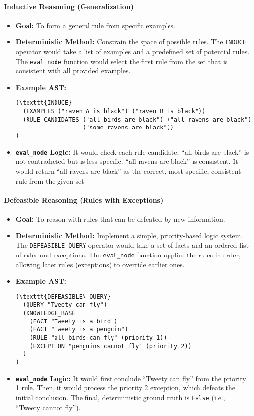 \documentclass{article}
\begin{document}
\paragraph{Inductive Reasoning (Generalization)}

\begin{itemize}
  \item \textbf{Goal:} To form a general rule from specific examples.
  \item \textbf{Deterministic Method:} Constrain the space of possible rules. The \texttt{INDUCE} operator would take a list of examples and a predefined set of potential rules. The \texttt{eval\_node} function would select the first rule from the set that is consistent with all provided examples.
  \item \textbf{Example AST:}
        \begin{verbatim}
(\texttt{INDUCE}
  (EXAMPLES ("raven A is black") ("raven B is black"))
  (RULE_CANDIDATES ("all birds are black") ("all ravens are black") 
                   ("some ravens are black"))
)
\end{verbatim}
  \item \textbf{\texttt{eval\_node} Logic:} It would check each rule candidate. ``all birds are black'' is not contradicted but is less specific. ``all ravens are black'' is consistent. It would return ``all ravens are black'' as the correct, most specific, consistent rule from the given set.
\end{itemize}

\paragraph{Defeasible Reasoning (Rules with Exceptions)}

\begin{itemize}
  \item \textbf{Goal:} To reason with rules that can be defeated by new information.
  \item \textbf{Deterministic Method:} Implement a simple, priority-based logic system. The \texttt{DEFEASIBLE\_QUERY} operator would take a set of facts and an ordered list of rules and exceptions. The \texttt{eval\_node} function applies the rules in order, allowing later rules (exceptions) to override earlier ones.
  \item \textbf{Example AST:}
        \begin{verbatim}
(\texttt{DEFEASIBLE\_QUERY}
  (QUERY "Tweety can fly")
  (KNOWLEDGE_BASE
    (FACT "Tweety is a bird")
    (FACT "Tweety is a penguin")
    (RULE "all birds can fly" (priority 1))
    (EXCEPTION "penguins cannot fly" (priority 2))
  )
)
\end{verbatim}
  \item \textbf{\texttt{eval\_node} Logic:} It would first conclude ``Tweety can fly'' from the priority 1 rule. Then, it would process the priority 2 exception, which defeats the initial conclusion. The final, deterministic ground truth is \texttt{False} (i.e., ``Tweety cannot fly'').
\end{itemize}
\end{document}

